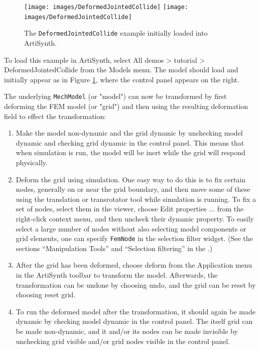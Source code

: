 \begin{figure}[ht]
\begin{center}
\iflatexml
 \texttt{[image: images/DeformedJointedCollide]}
\else
 \texttt{[image: images/DeformedJointedCollide]}
\fi
\end{center}
\caption{The {\tt DeformedJointedCollide} example initially loaded
into ArtiSynth.}
\label{DeformedJointedCollide:fig}
\end{figure}

To load this example in ArtiSynth, select {\sf All demos > tutorial >
DeformedJointedCollide} from the {\sf Models} menu. The model should load and
initially appear as in Figure \ref{DeformedJointedCollide:fig}, where
the control panel appears on the right.

The underlying {\tt MechModel} (or "model") can now be
transformed by first deforming the FEM model (or "grid") and
then using the resulting deformation field to effect the
transformation:

\begin{enumerate}

\item Make the model non-dynamic and the grid dynamic by unchecking
{\sf model dynamic} and checking {\sf grid dynamic} in the control
panel. This means that when simulation is run, the model will be inert
while the grid will respond physically.

\item Deform the grid using simulation. One easy way to do this is to
fix certain nodes, generally on or near the grid boundary, and then
move some of these using the translation or transrotator
tool while simulation is running. To fix a set of nodes, select
them in the viewer, choose {\sf Edit properties ...} from the
right-click context menu, and then uncheck their {\sf dynamic} property.
To easily select a large number of nodes without also selecting
model components or grid elements, one can specify {\tt FemNode}
in the selection filter widget. (See the sections
``Manipulation Tools'' and ``Selection filtering'' in the
.)

\item After the grid has been deformed, choose {\sf deform} from the
{\sf Application} menu in the ArtiSynth toolbar to transform the model.
Afterwards, the transformation can be undone by choosing {\sf undo},
and the grid can be reset by choosing {\sf reset grid}.

\item To run the deformed model after the transformation, it should
again be made dynamic by checking {\sf model dynamic} in the control
panel.  The itself grid can be made non-dynamic, and it and/or its
nodes can be made invisible by unchecking {\sf grid visible} and/or
{\sf grid nodes visible} in the control panel.

\end{enumerate}

